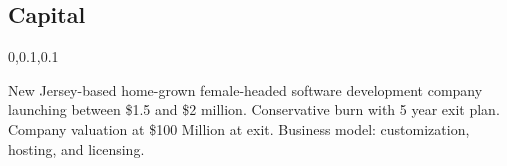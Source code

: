 
\begin{frame}{}
\section{Capital}
\vspace{-.5em}	

{\Large{}\selectfont

\hspace*{20pt}\begin{minipage}{.94\textwidth}
\vspace{4pt}
		
\begin{lightquadblockc}{0,0.1,0.1}{\parbox{21cm}{\centering \vspace{3pt}}}
\begin{center}\begin{minipage}{\textwidth}
{\Huge \setlength{\leftmargini}{30pt}\begin{enumerate}
\dmitem New Jersey-based home-grown female-headed software development company launching  between 
\$1.5 and \$2 million.
\vspace{20pt}
\dmitem Conservative burn with 5 year exit plan.
\vspace{20pt}
\dmitem Company valuation at \$100 Million at exit.
\footnotemark[1]
\vspace{20pt}
\dmitem Business model: customization, hosting, and licensing.
\vspace{20pt}
\footnotemark[2]
\end{enumerate}
}\end{minipage}
\end{center}
\end{lightquadblockc}
\end{minipage}

}

\end{frame}
